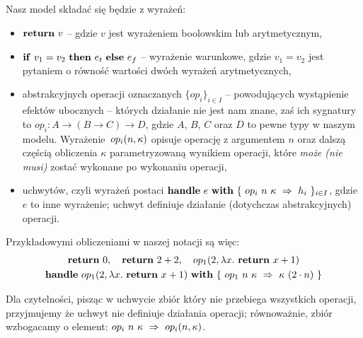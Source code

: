 Nasz model składać się będzie z wyrażeń:
\begin{itemize}
\item \(\mathbf{return}\ v\) -- gdzie \(v\) jest wyrażeniem boolowskim lub arytmetycznym,
\item \(\mathbf{if}\ v_1 = v_2\ \mathbf{then}\ e_t\ \mathbf{else}\ e_f\) -- wyrażenie warunkowe, gdzie \(v_1 = v_2\) jest pytaniem o równość wartości dwóch wyrażeń arytmetycznych,
\item abstrakcyjnych operacji oznaczanych \(\{op_i\}_{i \in I}\) -- powodujących wystąpienie efektów ubocznych -- których działanie nie jest nam znane, zaś ich sygnatury to \(op_i: A \rightarrow (B \rightarrow C) \rightarrow D\), gdzie \(A\), \(B\), \(C\) oraz \(D\) to pewne typy w naszym modelu. Wyrażenie~\(op_{i}(n, \kappa)\) opisuje operację z argumentem \(n\) oraz dalszą częścią obliczenia \(\kappa\) parametryzowaną wynikiem operacji, które \textit{może (nie musi)} zostać wykonane po wykonaniu operacji,
\item uchwytów, czyli wyrażeń postaci \(\mathbf{handle}\ e\ \mathbf{with}\ \{\ op_i\ n\ \kappa\ \Rightarrow\ h_i\ \}_{i \in I}\), gdzie \(e\) to inne wyrażenie; uchwyt definiuje działanie (dotychczas abstrakcyjnych) operacji. 
\end{itemize}

Przykładowymi obliczeniami w naszej notacji są więc:
\begin{equation}
\begin{gathered}
  \return{0},\quad\return{2 + 2},\quad \opi{1}{2}{\fun{x}{\return{x + 1}}} \\
  \handle{\opi{1}{2}{\fun{x}{\return{x + 1}}}}{\{\ \hcase{op_1}{n\ \kappa}{\kappa\ (2 \cdot n)} \ \}}
\end{gathered}
\end{equation}

Dla czytelności, pisząc w uchwycie zbiór który nie przebiega wszystkich operacji, przyjmujemy że uchwyt nie definiuje działania operacji; równoważnie, zbiór wzbogacamy o element: \(op_i\ n\ \kappa\ \Rightarrow\ op_i(n, \kappa)\).

